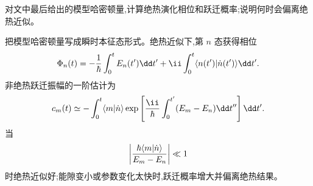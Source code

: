 \begin{question}
对文中最后给出的模型哈密顿量,计算绝热演化相位和跃迁概率;说明何时会偏离绝热近似。
\begin{solution}
把模型哈密顿量写成瞬时本征态形式。绝热近似下,第 $n$ 态获得相位
\[
\Phi_n(t)=-{1\over\hbar}\int_0^tE_n(t')\dd t'+\ii\int_0^t\langle n(t')|\dot n(t')\rangle\dd t'.
\]
非绝热跃迁振幅的一阶估计为
\[
c_m(t)\simeq-\int_0^t\langle m|\dot n\rangle
\exp\left[{\ii\over\hbar}\int_0^{t'}(E_m-E_n)\dd t''\right]\dd t'.
\]
当
\[
\left|{\hbar\langle m|\dot n\rangle\over E_m-E_n}\right|\ll1
\]
时绝热近似好;能隙变小或参数变化太快时,跃迁概率增大并偏离绝热结果。
\end{solution}
\end{question}
